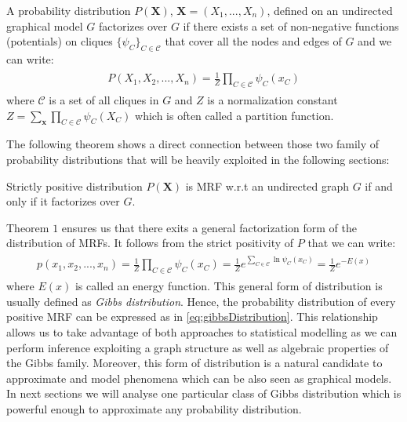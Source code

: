 \begin{mydef} A probability distribution $P(\mathbf{X})$, $\mathbf{X} =(X_1,..., X_n)$, defined on an undirected graphical model $G$ factorizes over $G$ if there exists a set of non-negative functions (potentials) on cliques $\{ \psi_{C} \}_{C \in \mathcal{C}}$  that cover all the nodes and edges of $G$ and we can write:
\begin{align*}
\begin{split}
P(X_1, X_2, ..., X_n) = \frac{1}{Z} \prod_{C \in \mathcal{C}} \psi
_C(x_C)
\end{split}
\end{align*}
where $\mathcal{C}$ is a set of all cliques in $G$ and $Z$ is a normalization constant $Z = \sum_{\mathbf{x}} \prod_{C \in \mathcal{C}} \psi_C(X_C) $ which is often called a partition function.
\end{mydef}
The following theorem shows a direct connection between those two family of probability distributions that will be heavily exploited in the following sections:
\begin{theorem}  Strictly positive distribution $P(\mathbf{X})$ is MRF  w.r.t an undirected graph $G$ if and only if it factorizes over $G$.
\end{theorem}
Theorem $1$ ensures us that there exits a general factorization form of the distribution of MRFs. It follows from the strict positivity of $P$ that we can write:
\begin{align}
\begin{split}
p(x_1, x_2, ..., x_n) = \frac{1}{Z} \prod_{C \in \mathcal{C}} \psi
_C(x_C) = \frac{1}{Z} e ^{\sum_{C \in \mathcal{C}} \ln \psi
_C(x_C) } = \frac{1}{Z} e ^{-E(x)}
\end{split}
\label{eq:gibbsDistribution}
\end{align}
where $E(x)$ is called an energy function. This general form of distribution is usually defined as \emph{Gibbs distribution}. Hence, the probability distribution of every positive MRF can be expressed as in \ref{eq:gibbsDistribution}. 
This relationship allows us to take advantage of both approaches to statistical modelling as we can perform inference exploiting a graph structure as well as algebraic properties of the Gibbs family. Moreover, this form of distribution is a natural candidate to approximate and model phenomena which can be also seen as graphical models. In next sections we will analyse one particular class of Gibbs distribution which is powerful enough to approximate any probability distribution.

